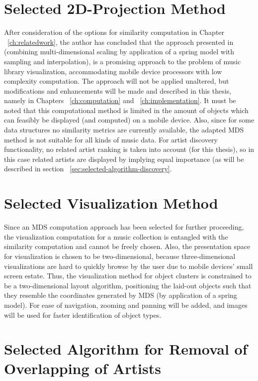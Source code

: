 \section{Selected 2D-Projection Method}

After consideration of the options for similarity computation in Chapter ~\ref{ch:relatedwork}, the author has concluded that the approach presented in \cite{Morrison:2003:FMS} (combining multi-dimensional scaling by application of a spring model with sampling and interpolation), is a promising approach to the problem of music library visualization, accommodating mobile device processors with low complexity computation. The approach will not be applied unaltered, but modifications and enhancements will be made and described in this thesis, namely in Chapters ~\ref{ch:computation} and ~\ref{ch:implementation}.
It must be noted that this computational method is limited in the amount of objects which can feasibly be displayed (and computed) on a mobile device. Also, since for some data structures no similarity metrics are currently available, the adapted MDS method is not suitable for all kinds of music data. For artist discovery functionality, no related artist ranking is taken into account (for this thesis), so in this case related artists are displayed by implying equal importance (as will be described in section ~\ref{sec:selected-algorithm-discovery}.

\section{Selected Visualization Method}

Since an MDS computation approach has been selected for further proceeding, the visualization computation for a music collection is entangled with the similarity computation and cannot be freely chosen. Also, the presentation space for visualization is chosen to be two-dimensional, because three-dimensional visualizations are hard to quickly browse by the user due to mobile devices' small screen estate. Thus, the visualization method for object clusters is constrained to be a two-dimensional layout algorithm, positioning the laid-out objects such that they resemble the coordinates generated by MDS (by application of a spring model). For ease of navigation, zooming and panning will be added, and images will be used for faster identification of object types.

\section{Selected Algorithm for Removal of Overlapping of Artists}

